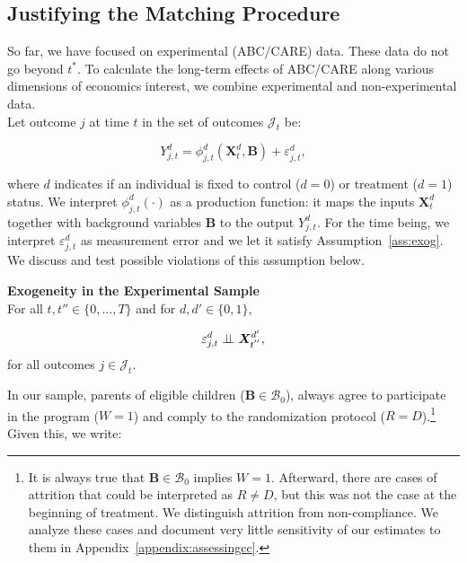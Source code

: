 \begin{figure}
\end{figure}

\subsection{Justifying the Matching Procedure} \label{section:just}

\noindent So far, we have focused on experimental (ABC/CARE) data. These data do not go beyond $t^*$. To calculate the long-term effects of ABC/CARE along various dimensions of economics interest, we combine experimental and non-experimental data. \\

\noindent Let outcome $j$ at time $t$ in the set of outcomes $\mathcal{J}_{t}$ be: 

\begin{equation}
Y_{j,t}^d = \phi_{j,t}^d \left( \bm{X}_{t}^d, \bm{B} \right) + \varepsilon_{j,t}^d, \label{eq:outcome}
\end{equation}

\noindent where $d$ indicates if an individual is fixed to control ($d = 0 $) or treatment ($d = 1$) status. We interpret  $\phi_{j,t}^d \left( \cdot \right)$ as a production function: it maps the inputs $\bm{X}_{t}^d$ together with background variables $\bm{B}$ to the output $Y_{j,t}^d$. For the time being, we interpret $\varepsilon_{j,t}^d$ as measurement error and we let it satisfy Assumption~\ref{ass:exog}. We discuss and test possible violations of this assumption below.

\begin{assumption}\label{ass:exog} \textbf{Exogeneity in the Experimental Sample}\\
For all $t, t'' \in \{ 0, \ldots, T \}$ and for $d, d' \in \{0,1\}$,

\begin{equation}
\varepsilon^d_{j,t} \perp\!\!\!\perp \bm{X}^{d^{\prime}}_{t^{''}},
\end{equation}
\noindent for all outcomes $j \in \mathcal{J}_{t}$.
\end{assumption}

\noindent In our sample, parents of eligible children ($\bm{B} \in \mathcal{B}_{0}$), always agree to participate in the program ($W = 1$) and comply to the randomization protocol ($R = D$).\footnote{It is always true that $\bm{B} \in \mathcal{B}_{0}$ implies $W = 1$. Afterward, there are cases of attrition that could be interpreted as $R \neq D$, but this was not the case at the beginning of treatment. We distinguish attrition from non-compliance. We analyze these cases and document very little sensitivity of our estimates to them in Appendix~\ref{appendix:assessingcc}.} Given this, we write:

